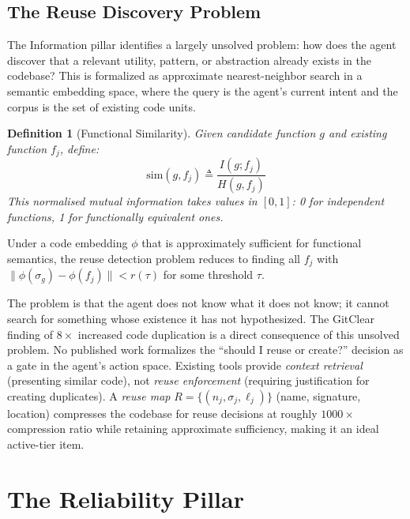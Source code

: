 \documentclass[11pt, a4paper, logo, copyright]{googledeepmind}
\newtheorem{definition}{Definition}[section]
\begin{document}
\subsection{The Reuse Discovery Problem}

The Information pillar identifies a largely unsolved problem: how does the agent discover that a relevant utility, pattern, or abstraction already exists in the codebase? This is formalized as approximate nearest-neighbor search in a semantic embedding space, where the query is the agent's current intent and the corpus is the set of existing code units.

\begin{definition}[Functional Similarity]
Given candidate function $g$ and existing function $f_j$, define:
\begin{equation}
    \text{sim}(g, f_j) \triangleq \frac{I(g; f_j)}{H(g, f_j)}
\end{equation}
This normalised mutual information takes values in $[0,1]$: 0 for independent functions, 1 for functionally equivalent ones.
\end{definition}

Under a code embedding $\phi$ that is approximately sufficient for functional semantics, the reuse detection problem reduces to finding all $f_j$ with $\|\phi(\sigma_g) - \phi(f_j)\| < r(\tau)$ for some threshold $\tau$.

The problem is that the agent does not know what it does not know; it cannot search for something whose existence it has not hypothesized. The GitClear finding of $8\times$ increased code duplication \citep{gitclear2025} is a direct consequence of this unsolved problem. No published work formalizes the ``should I reuse or create?'' decision as a gate in the agent's action space. Existing tools provide \emph{context retrieval} (presenting similar code), not \emph{reuse enforcement} (requiring justification for creating duplicates). A \emph{reuse map} $R = \{(n_j, \sigma_j, \ell_j)\}$ (name, signature, location) compresses the codebase for reuse decisions at roughly $1000\times$ compression ratio while retaining approximate sufficiency, making it an ideal active-tier item.


\section{The Reliability Pillar}
\label{sec:reliability}
\end{document}
